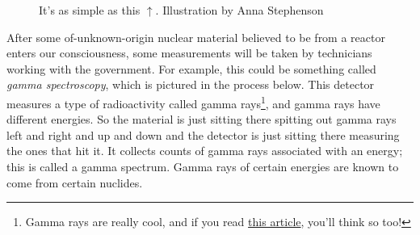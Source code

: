 {\begin{figure}[H]
  \centering
  \large It's as simple as this $\uparrow$. \small Illustration by Anna Stephenson
\end{figure}

After some of-unknown-origin nuclear material believed to be from a reactor
enters our consciousness, some measurements will be taken by technicians
working with the government. For example, this could be something called
\textit{gamma spectroscopy}, which is pictured in the process below. This
detector measures a type of radioactivity called gamma rays\footnote{Gamma rays
are really cool, and if you read
\href{https://www.symmetrymagazine.org/article/incredible-hulking-facts-about-gamma-rays}{\color{violet}this
article}, you'll think so too!}, and gamma rays have different energies. So the
material is just sitting there spitting out gamma rays left and right and up
and down and the detector is just sitting there measuring the ones that hit it.
It collects counts of gamma rays associated with an energy; this is called a
gamma spectrum. Gamma rays of certain energies are known to come from certain
nuclides. 

}
